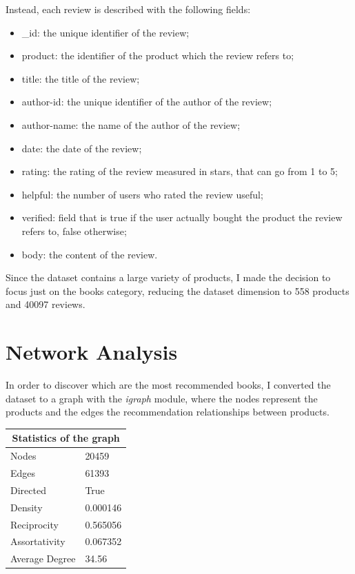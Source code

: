 \documentclass[a4paper,12pt]{article}
\begin{document}
\noindent Instead, each review is described with the following fields:
\begin{itemize}
	\item \_id: the unique identifier of the review;
	\item product: the identifier of the product which the review refers to;
	\item title: the title of the review;
	\item author-id: the unique identifier of the author of the review;
	\item author-name: the name of the author of the review;
	\item date: the date of the review;
	\item rating: the rating of the review measured in stars, that can go from 1 to 5;
	\item helpful: the number of users who rated the review useful;
	\item verified: field that is true if the user actually bought the product the review refers to, false
	otherwise;
	\item body: the content of the review.
\end{itemize}

\noindent Since the dataset contains a large variety of products, I made the decision to focus just on the books category, reducing the dataset dimension to 558 products and 40097 reviews. 

\newpage



\section{Network Analysis}
\noindent In order to discover which are the most recommended books, I converted the dataset to a graph with the \textit{igraph} module, where the nodes represent the products and the edges the recommendation relationships between products. 

\begin{table}[H]
	\centering
	\begin{tabular}{|l|l|}
		\hline
		\multicolumn{2}{|c|}{Statistics of the graph} \\ \hline
		Nodes                    & 20459              \\
		Edges                    & 61393              \\
		Directed                 & True               \\
		Density                  & 0.000146           \\
		Reciprocity              & 0.565056           \\
		Assortativity            & 0.067352           \\
		Average Degree           & 34.56             \\
		\hline
	\end{tabular}
\end{table}
\end{document}
